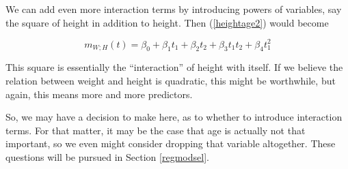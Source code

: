 We can add even more interaction terms by introducing powers of
variables, say the square of height in addition to height.  Then 
(\ref{heightage2}) would become

\begin{equation}
\label{heightage2a}
m_{W;H}(t) = \beta_0 + \beta_1 t_1 + \beta_2 t_2 + \beta_3 t_1 t_2 +
\beta_4 t^2_1
\end{equation}

This
square is essentially the ``interaction'' of height with itself.  If we
believe the relation between weight and height is quadratic, this might
be worthwhile, but again, this means more and more predictors.

So, we may have a decision to make here, as to whether to introduce
interaction terms.  For that matter, it may be the case that age is
actually not that important, so we even might consider dropping that
variable altogether.  These questions will be pursued in Section
\ref{regmodsel}.


